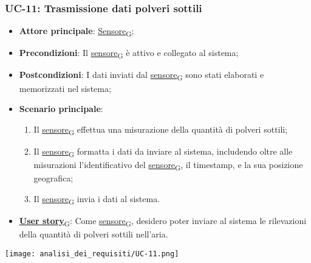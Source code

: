 \subsubsection{UC-11: Trasmissione dati polveri sottili}
\begin{itemize}
	\item \textbf{Attore principale}: \href{https://7last.github.io/docs/rtb/documentazione-interna/glossario\#sensore}{Sensore\textsubscript{G}};
	\item \textbf{Precondizioni}: Il \href{https://7last.github.io/docs/rtb/documentazione-interna/glossario\#sensore}{sensore\textsubscript{G}} è attivo e collegato al sistema;
	\item \textbf{Postcondizioni}: I dati inviati dal \href{https://7last.github.io/docs/rtb/documentazione-interna/glossario\#sensore}{sensore\textsubscript{G}} sono stati elaborati e memorizzati nel sistema;
	\item \textbf{Scenario principale}:
	      \begin{enumerate}
		      \item Il \href{https://7last.github.io/docs/rtb/documentazione-interna/glossario\#sensore}{sensore\textsubscript{G}} effettua una misurazione della quantità di polveri sottili;
		      \item Il \href{https://7last.github.io/docs/rtb/documentazione-interna/glossario\#sensore}{sensore\textsubscript{G}} formatta i dati da inviare al sistema, includendo oltre alle misurazioni l'identificativo del \href{https://7last.github.io/docs/rtb/documentazione-interna/glossario\#sensore}{sensore\textsubscript{G}},
		            il timestamp, e la sua posizione geografica;
		      \item Il \href{https://7last.github.io/docs/rtb/documentazione-interna/glossario\#sensore}{sensore\textsubscript{G}} invia i dati al sistema.
	      \end{enumerate}
	\item \href{https://7last.github.io/docs/rtb/documentazione-interna/glossario\#user-story}{\textbf{User story}\textsubscript{G}}: Come \href{https://7last.github.io/docs/rtb/documentazione-interna/glossario\#sensore}{sensore\textsubscript{G}}, desidero poter inviare al sistema le rilevazioni della quantità di polveri sottili nell'aria.
\end{itemize}

\begin{center}
	\texttt{[image: analisi\_dei\_requisiti/UC-11.png]}
\end{center}

